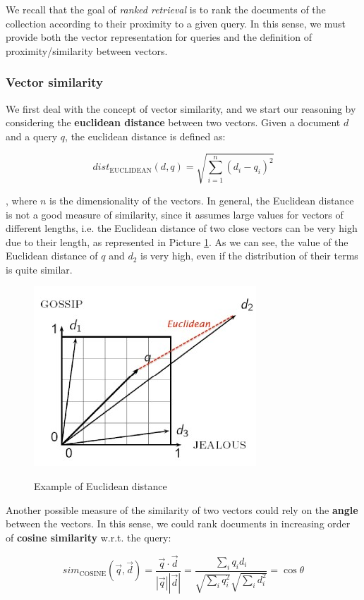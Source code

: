We recall that the goal of \textit{ranked retrieval} is to rank the documents of the collection according to their proximity to a given query. In this sense, we must provide both the vector representation for queries and the definition of proximity/similarity between vectors.

\subsubsection{Vector similarity}
We first deal with the concept of vector similarity, and we start our reasoning by considering the \textbf{euclidean distance} between two vectors. Given a document $d$ and a query $q$, the euclidean distance is defined as:

$$
dist_{\text{EUCLIDEAN}}(d,q) = \sqrt{\sum_{i = 1}^n (d_i - q_i)^2}
$$

, where $n$ is the dimensionality of the vectors. In general, the Euclidean distance is not a good measure of similarity, since it assumes large values for vectors of different lengths, i.e. the Euclidean distance of two close vectors can be very high due to their length, as represented in Picture \ref{eucl}. As we can see, the value of the Euclidean distance of $q$ and $d_2$ is very high, even if the distribution of their terms is quite similar.

\begin{figure}[h!]
		\centering
		\includegraphics[scale = 2.0]{img/eucl.jpg}
		\label{eucl}
        \caption{Example of Euclidean distance}
\end{figure}

Another possible measure of the similarity of two vectors could rely on the \textbf{angle} between the vectors. In this sense, we could rank documents in increasing order of \textbf{cosine similarity} w.r.t. the query:

$$
sim_{\text{COSINE}}(\Vec{q},\Vec{d}) = \frac{\Vec{q} \cdot \Vec{d}}{|\Vec{q}||\Vec{d}|} = \frac{\sum_i q_i d_i}{\sqrt{\sum_i q_i^2} \sqrt{\sum_i d_i^2}} = \cos{\theta}
$$

